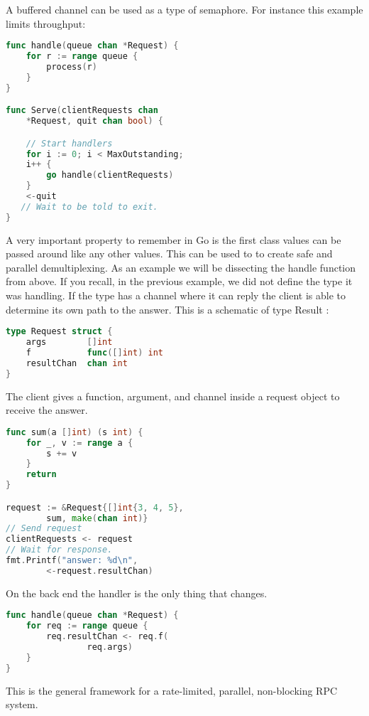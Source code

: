 	A buffered channel can be used as a type of semaphore. For instance this example limits throughput:
\begin{lstlisting}[language=Go]
func handle(queue chan *Request) {
    for r := range queue {
        process(r)
    }
}

func Serve(clientRequests chan 
	*Request, quit chan bool) {

    // Start handlers
    for i := 0; i < MaxOutstanding;
    i++ {
        go handle(clientRequests)
    }
    <-quit 
   // Wait to be told to exit.
} 
\end{lstlisting}
A very important property to remember in Go is the first class values can be passed around like any other values. This can be used to to create safe and parallel demultiplexing. As an example we will be dissecting the handle function from above. If you recall, in the previous example, we did not define the type it was handling. If the type has a channel where it can reply the client is able to determine its own path to the answer. This is a schematic of type Result :
\begin{lstlisting}[language=Go]
type Request struct {
    args        []int
    f           func([]int) int
    resultChan  chan int
} 
\end{lstlisting}
The client gives a function, argument, and channel inside a request object to receive the answer.
\begin{lstlisting}[language=Go]
func sum(a []int) (s int) {
    for _, v := range a {
        s += v
    }
    return
}

request := &Request{[]int{3, 4, 5}, 
	 	sum, make(chan int)}
// Send request
clientRequests <- request
// Wait for response.
fmt.Printf("answer: %d\n",
		<-request.resultChan)
\end{lstlisting}
On the back end the handler is the only thing that changes. 
\begin{lstlisting}[language=Go]
func handle(queue chan *Request) {
    for req := range queue {
        req.resultChan <- req.f(
			    req.args)
    }
} 
\end{lstlisting}
This is the general framework for a rate-limited, parallel, non-blocking RPC system.
